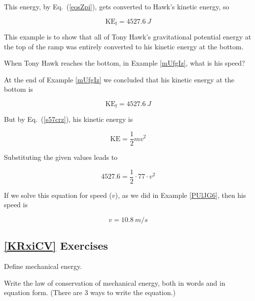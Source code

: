 \documentclass{article}
\numberwithin{equation}{section}
\numberwithin{figure}{section}
\begin{document}
This energy, by Eq.~(\ref{eosZpi}), gets converted to Hawk's kinetic energy, so

\begin{equation*}
    \mathrm{KE_f} = \SI{4527.6}{J} 
\end{equation*}

This example is to show that all of Tony Hawk's gravitational potential energy at the top of the ramp was entirely converted to his kinetic energy at the bottom.

\cyanhrule

\clearpage

\begin{example} \label{nQVUKM}
    When Tony Hawk reaches the bottom, in Example \ref{mUfgIz}, what is his speed?
\end{example}

\Solution At the end of Example \ref{mUfgIz} we concluded that his kinetic energy at the bottom is 

\begin{equation*}
    \mathrm{KE_f} = \SI{4527.6}{J}
\end{equation*}

But by Eq.~(\ref{s57crz}), his kinetic energy is

\begin{equation*}
    \mathrm{KE} = \frac{1}{2} m v^2
\end{equation*}

Substituting the given values leads to 

\begin{equation*}
    4527.6 = \frac{1}{2} \cdot 77 \cdot v^2
\end{equation*}

If we solve this equation for speed ($v$), as we did in Example \ref{PUlJG6}, then his speed is

\begin{equation*}
    v = \SI{10.8}{m/s}
\end{equation*}

\cyanhrule

\subsection*{\ref{KRxiCV} Exercises}

\begin{exercise} \label{2EkX0c}
    Define mechanical energy.
\end{exercise}

\begin{exercise}
    Write the law of conservation of mechanical energy, both in words and in equation form. (There are 3 ways to write the equation.)
\end{exercise}
\end{document}

